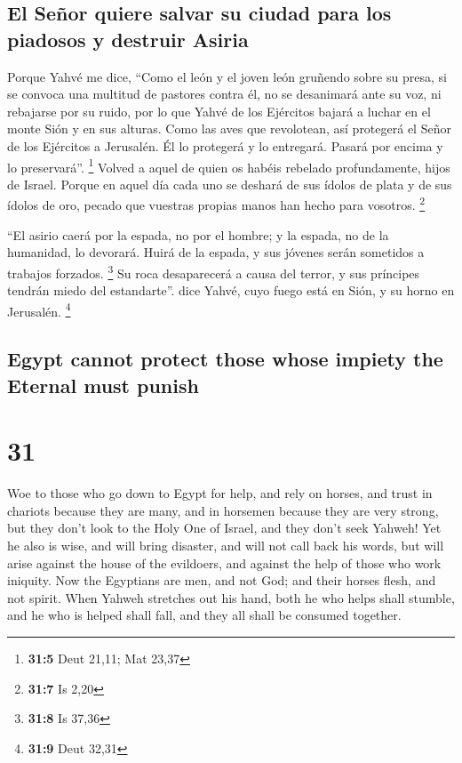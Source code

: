 \begin{paracol}{2}
\hypertarget{el-seuxf1or-quiere-salvar-su-ciudad-para-los-piadosos-y-destruir-asiria}{%
\subsection{El Señor quiere salvar su ciudad para los piadosos y
destruir
Asiria}\label{el-seuxf1or-quiere-salvar-su-ciudad-para-los-piadosos-y-destruir-asiria}}

 Porque Yahvé me dice, ``Como el león y el joven león
gruñendo sobre su presa, si se convoca una multitud de pastores contra
él, no se desanimará ante su voz, ni rebajarse por su ruido, por lo que
Yahvé de los Ejércitos bajará a luchar en el monte Sión y en sus
alturas.  Como las aves que revolotean, así protegerá el
Señor de los Ejércitos a Jerusalén. Él lo protegerá y lo entregará.
Pasará por encima y lo preservará''. \footnote{\textbf{31:5} Deut 21,11;
  Mat 23,37}  Volved a aquel de quien os habéis rebelado
profundamente, hijos de Israel.  Porque en aquel día cada
uno se deshará de sus ídolos de plata y de sus ídolos de oro, pecado que
vuestras propias manos han hecho para vosotros. \footnote{\textbf{31:7}
  Is 2,20}

 ``El asirio caerá por la espada, no por el hombre; y la
espada, no de la humanidad, lo devorará. Huirá de la espada, y sus
jóvenes serán sometidos a trabajos forzados. \footnote{\textbf{31:8} Is
  37,36}  Su roca desaparecerá a causa del terror, y sus
príncipes tendrán miedo del estandarte''. dice Yahvé, cuyo fuego está en
Sión, y su horno en Jerusalén. \footnote{\textbf{31:9} Deut 32,31}

\switchcolumn
\begin{otherlanguage}{english}

\hypertarget{egypt-cannot-protect-those-whose-impiety-the-eternal-must-punish}{%
\subsection{Egypt cannot protect those whose impiety the Eternal must
punish}\label{egypt-cannot-protect-those-whose-impiety-the-eternal-must-punish}}

\hypertarget{section-61}{%
\section{31}\label{section-61}}

 Woe to those who go down to Egypt for help, and rely on
horses, and trust in chariots because they are many, and in horsemen
because they are very strong, but they don't look to the Holy One of
Israel, and they don't seek Yahweh!  Yet he also is wise,
and will bring disaster, and will not call back his words, but will
arise against the house of the evildoers, and against the help of those
who work iniquity.  Now the Egyptians are men, and not
God; and their horses flesh, and not spirit. When Yahweh stretches out
his hand, both he who helps shall stumble, and he who is helped shall
fall, and they all shall be consumed together.


\end{otherlanguage}
\end{paracol}
